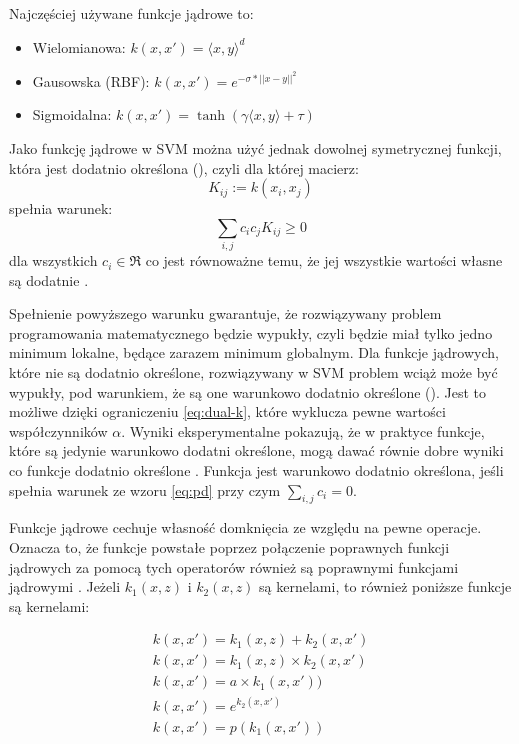 Najczęściej używane funkcje jądrowe to:	
\begin{itemize}
	\item Wielomianowa: $ k(x, x') = \langle x,y \rangle ^d $
	\item Gausowska (RBF): $k(x, x') =  e^{-\sigma*||x-y||^2} $	
	\item Sigmoidalna: $ k(x, x') = \tanh(\gamma \langle x,y \rangle + \tau) $
\end{itemize}

Jako funkcję jądrowe w SVM można użyć jednak dowolnej symetrycznej funkcji, która jest dodatnio określona (), czyli dla której macierz:
$$ K_{ij} := k(x_i, x_j) $$
spełnia warunek:
\begin{equation}
\label{eq:pd}
\sum_{i,j}c_i c_j K_{ij} \geq 0
\end{equation} 
dla wszystkich $ c_i \in \Re $
co jest równoważne temu, że jej wszystkie wartości własne są dodatnie \cite{scholkopf_learning_2002}.

Spełnienie powyższego warunku gwarantuje, że rozwiązywany problem programowania matematycznego będzie wypukły, czyli będzie miał tylko jedno minimum lokalne, będące zarazem minimum globalnym.
Dla funkcje jądrowych, które nie są dodatnio określone, rozwiązywany w SVM problem wciąż może być wypukły, pod warunkiem, że są one warunkowo dodatnio określone (). Jest to możliwe dzięki ograniczeniu \ref{eq:dual-k}, które wyklucza pewne wartości współczynników $ \alpha $. Wyniki eksperymentalne pokazują, że w praktyce funkcje, które są jedynie warunkowo dodatni określone, mogą dawać równie dobre wyniki co funkcje dodatnio określone \cite{2005Boughorbel}. Funkcja jest warunkowo dodatnio określona, jeśli spełnia warunek ze wzoru \ref{eq:pd} przy czym $ \sum_{i,j} c_i = 0 $.


Funkcje jądrowe cechuje własność domknięcia ze względu na pewne operacje. Oznacza to, że funkcje powstałe poprzez połączenie poprawnych funkcji jądrowych za pomocą tych operatorów również są poprawnymi funkcjami jądrowymi \cite{Shawe-Taylor:2004:KMP:975545}. Jeżeli $ k_1(x, z) $ i $ k_2 (x,z) $ są kernelami, to również poniższe funkcje są kernelami:

\begin{equation}
\begin{array}{ll}
	k(x, x') = k_1(x,z) + k_2(x,x') \\
	k(x, x') = k_1(x,z) \times k_2(x,x') \\
	k(x, x') = a \times k_1(x,x')) \\
	k(x, x') = e^{k_2(x,x')} \\
	k(x, x') = p(k_1(x,x')) 	
\end{array}
\label{eq:kernelclosure}
\end{equation}

